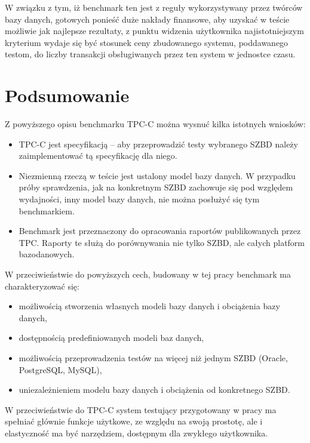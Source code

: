W związku z tym, iż benchmark ten jest z reguły wykorzystywany przez twórców bazy danych,
gotowych ponieść duże nakłady finansowe, aby uzyskać w teście możliwie jak najlepsze rezultaty,
z punktu widzenia użytkownika najistotniejszym kryterium wydaje się być stosunek ceny zbudowanego systemu,
poddawanego testom, do liczby transakcji obsługiwanych przez ten system w jednostce czasu. 

\section{Podsumowanie}

Z powyższego opisu benchmarku TPC-C można wysnuć kilka istotnych wniosków:

\begin{itemize}
    \item TPC-C jest specyfikacją -- aby przeprowadzić testy wybranego SZBD należy zaimplementować 
    tą specyfikację dla niego.
    \item Niezmienną rzeczą w teście jest ustalony model bazy danych. W przypadku próby sprawdzenia,
    jak na konkretnym SZBD zachowuje się pod względem wydajności, inny model bazy danych, nie można
    posłużyć się tym benchmarkiem.
    \item Benchmark jest przeznaczony do opracowania raportów publikowanych przez TPC. Raporty te służą
    do porównywania nie tylko SZBD, ale całych platform bazodanowych.
\end{itemize}

W przeciwieństwie do powyższych cech, budowany w tej pracy benchmark ma charakteryzować się:
\begin{itemize}
    \item możliwością stworzenia własnych modeli bazy danych i obciążenia bazy danych,
    \item dostępnością predefiniowanych modeli baz danych,
    \item możliwością przeprowadzenia testów na więcej niż jednym SZBD (Oracle, PostgreSQL, MySQL),
    \item uniezależnieniem modelu bazy danych i obciążenia od konkretnego SZBD. 
\end{itemize}

W przeciwieństwie do TPC-C system testujący przygotowany w pracy ma spełniać głównie funkcje użytkowe, 
ze względu na swoją prostotę, ale i elastyczność ma być narzędziem, dostępnym dla zwykłego użytkownika.

